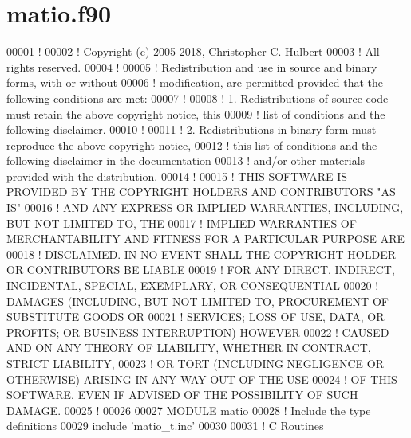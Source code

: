 \hypertarget{matio_8f90_source}{}\section{matio.\+f90}
\label{matio_8f90_source}

\begin{DoxyCode}
00001 \textcolor{comment}{!}
00002 \textcolor{comment}{! Copyright (c) 2005-2018, Christopher C. Hulbert}
00003 \textcolor{comment}{! All rights reserved.}
00004 \textcolor{comment}{!}
00005 \textcolor{comment}{! Redistribution and use in source and binary forms, with or without}
00006 \textcolor{comment}{! modification, are permitted provided that the following conditions are met:}
00007 \textcolor{comment}{!}
00008 \textcolor{comment}{! 1. Redistributions of source code must retain the above copyright notice, this}
00009 \textcolor{comment}{!    list of conditions and the following disclaimer.}
00010 \textcolor{comment}{!}
00011 \textcolor{comment}{! 2. Redistributions in binary form must reproduce the above copyright notice,}
00012 \textcolor{comment}{!    this list of conditions and the following disclaimer in the documentation}
00013 \textcolor{comment}{!    and/or other materials provided with the distribution.}
00014 \textcolor{comment}{!}
00015 \textcolor{comment}{! THIS SOFTWARE IS PROVIDED BY THE COPYRIGHT HOLDERS AND CONTRIBUTORS "AS IS"}
00016 \textcolor{comment}{! AND ANY EXPRESS OR IMPLIED WARRANTIES, INCLUDING, BUT NOT LIMITED TO, THE}
00017 \textcolor{comment}{! IMPLIED WARRANTIES OF MERCHANTABILITY AND FITNESS FOR A PARTICULAR PURPOSE ARE}
00018 \textcolor{comment}{! DISCLAIMED. IN NO EVENT SHALL THE COPYRIGHT HOLDER OR CONTRIBUTORS BE LIABLE}
00019 \textcolor{comment}{! FOR ANY DIRECT, INDIRECT, INCIDENTAL, SPECIAL, EXEMPLARY, OR CONSEQUENTIAL}
00020 \textcolor{comment}{! DAMAGES (INCLUDING, BUT NOT LIMITED TO, PROCUREMENT OF SUBSTITUTE GOODS OR}
00021 \textcolor{comment}{! SERVICES; LOSS OF USE, DATA, OR PROFITS; OR BUSINESS INTERRUPTION) HOWEVER}
00022 \textcolor{comment}{! CAUSED AND ON ANY THEORY OF LIABILITY, WHETHER IN CONTRACT, STRICT LIABILITY,}
00023 \textcolor{comment}{! OR TORT (INCLUDING NEGLIGENCE OR OTHERWISE) ARISING IN ANY WAY OUT OF THE USE}
00024 \textcolor{comment}{! OF THIS SOFTWARE, EVEN IF ADVISED OF THE POSSIBILITY OF SUCH DAMAGE.}
00025 \textcolor{comment}{!}
00026 
00027 \textcolor{keyword}{MODULE} matio
00028 \textcolor{comment}{!   Include the type definitions}
00029     include \textcolor{stringliteral}{'matio\_t.inc'}
00030 
00031 \textcolor{comment}{!   C Routines}

\end{DoxyCode}
